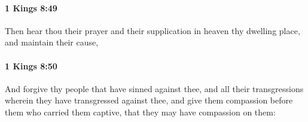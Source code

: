		\paragraph{1 Kings 8:49} %
			\label{1KINGS-8-49}

			Then hear thou their prayer and their supplication in heaven thy dwelling place, and maintain their cause,


		\paragraph{1 Kings 8:50} %
			\label{1KINGS-8-50}

			And forgive thy people that have sinned against thee, and all their transgressions wherein they have transgressed against thee, and give them compassion before them who carried them captive, that they may have compassion on them:


